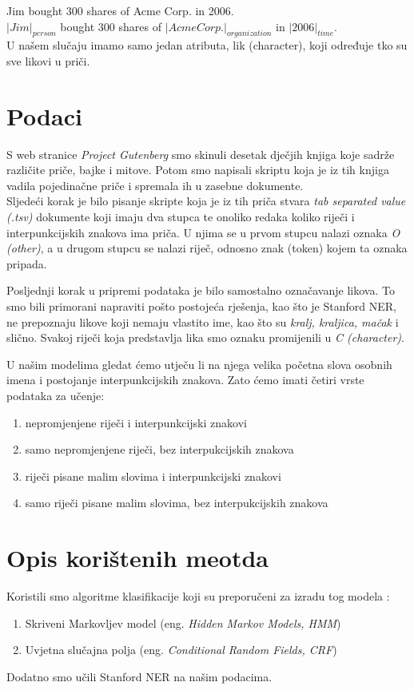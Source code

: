 \documentclass[conference]{IEEEtran}
\begin{document}
	Jim bought 300 shares of Acme Corp. in 2006.\\
	
	$|Jim|_{person}$ bought 300 shares of $|Acme Corp.|_{organization}$ in $|2006|_{time}$.\\
	
	U našem slučaju imamo samo jedan atributa, lik (character), koji određuje tko su sve likovi u priči.
	
	
\section{Podaci}
	S web stranice \textit{Project Gutenberg} smo skinuli desetak dječjih knjiga koje sadrže različite priče, bajke i mitove. Potom smo napisali skriptu koja je iz tih knjiga vadila pojedinačne priče i spremala ih u zasebne dokumente.\\
	Sljedeći korak je bilo pisanje skripte koja je iz tih priča stvara \textit{tab separated value (.tsv)} dokumente koji imaju dva stupca te onoliko redaka koliko riječi i interpunkcijskih znakova ima priča. U njima se u prvom stupcu nalazi oznaka \textit{O (other)}, a u drugom stupcu se nalazi riječ, odnosno znak (token) kojem ta oznaka pripada.
		
	Posljednji korak u pripremi podataka je bilo samostalno označavanje likova. To smo bili primorani napraviti pošto postojeća rješenja, kao što je Stanford NER, ne prepoznaju likove koji nemaju vlastito ime, kao što su \textit{kralj, kraljica, mačak} i slično. Svakoj riječi koja predstavlja lika smo oznaku promijenili u \textit{C (character)}.
	
	U našim modelima gledat ćemo utječu li na njega velika početna slova osobnih imena i postojanje interpunkcijskih znakova. Zato ćemo imati četiri vrste podataka za učenje:
	\begin{enumerate}
		\item nepromjenjene riječi i interpunkcijski znakovi 
		\item samo nepromjenjene riječi, bez interpukcijskih znakova
		\item riječi pisane malim slovima i interpunkcijski znakovi
		\item samo riječi pisane malim slovima, bez interpukcijskih znakova
	\end{enumerate} 


\section{Opis korištenih meotda}
	Koristili smo algoritme klasifikacije koji su preporučeni za izradu tog modela :
	\begin{enumerate}
	\item Skriveni Markovljev model (eng. \textit{Hidden Markov Models, HMM})
	\item Uvjetna slučajna polja (eng. \textit{Conditional Random Fields, CRF})
	\end{enumerate}
	Dodatno smo učili Stanford NER na našim podacima.
	
\end{document}
